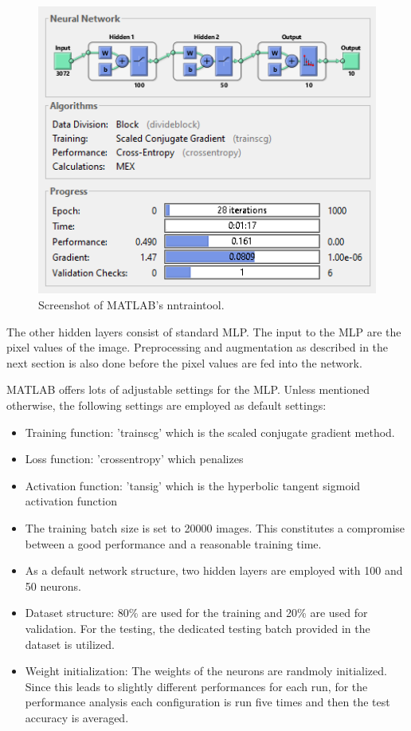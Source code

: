 \begin{figure}[h!]
  	\centering
  	\includegraphics{images/NNtool}
  	\caption{Screenshot of MATLAB's nntraintool.}
  	\label{fig:NNtool}
\end{figure}

The other hidden layers consist of standard MLP. The input to the MLP are the pixel values of the image. Preprocessing and augmentation as described in the next section is also done before the pixel values are fed into the network.

MATLAB offers lots of adjustable settings for the MLP. Unless mentioned otherwise, the following settings are employed as default settings:

\begin{itemize}
	\item Training function: 'trainscg' which is the scaled conjugate gradient method.
	
	\item Loss function: 'crossentropy' which penalizes
	
	\item Activation function: 'tansig' which is the hyperbolic tangent sigmoid activation function 
	
	\item The training batch size is set to 20000 images. This constitutes a compromise between a good performance and a reasonable training time.
	
	\item As a default network structure, two hidden layers are employed with 100 and 50 neurons.
	
	\item Dataset structure: 80\% are used for the training and 20\% are used for validation. For the testing, the dedicated testing batch provided in the dataset is utilized.
	
	\item Weight initialization: The weights of the neurons are randmoly initialized. Since this leads to slightly different performances for each run, for the performance analysis each configuration is run five times and then the test accuracy is averaged.
\end{itemize}


